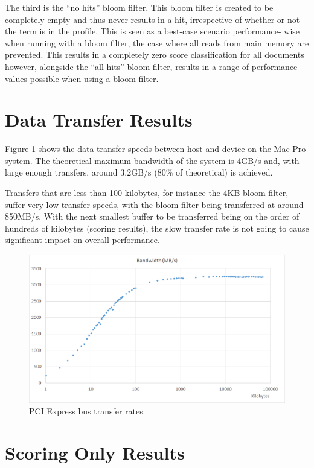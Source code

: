 The third is the ``no hits'' bloom filter. This bloom filter is created to be
completely empty and thus never results in a hit, irrespective of whether or not
the term is in the profile. This is seen as a best-case scenario performance-
wise when running with a bloom filter, the case where all reads from main memory
are prevented. This results in a completely zero score classification for all
documents however, alongside the ``all hits'' bloom filter, results in a range
of performance values possible when using a bloom filter.

\section{Data Transfer Results}

Figure \ref{fig:dataTransfer} shows the data transfer speeds between host and
device on the Mac Pro system. The theoretical maximum bandwidth of the system is
4GB/s and, with large enough transfers, around 3.2GB/s (80\% of theoretical)
is achieved.

Transfers that are less than 100 kilobytes, for instance the 4KB bloom filter,
suffer very low transfer speeds, with the bloom filter being transferred at
around 850MB/s. With the next smallest buffer to be transferred being on the
order of hundreds of kilobytes (scoring results), the slow transfer rate is
not going to cause significant impact on overall performance.

\begin{figure}[H]
\centering
\includegraphics[width=\linewidth]{images/faraBandwidth.png}
\caption{PCI Express bus transfer rates}
\label{fig:dataTransfer}
\end{figure}

\section{Scoring Only Results}

